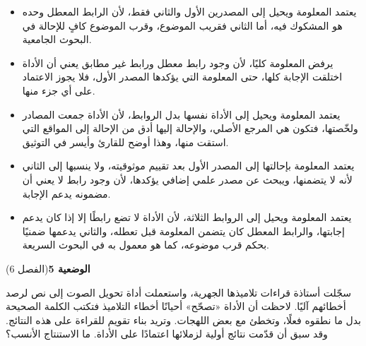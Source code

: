 \documentclass[11pt,a4paper]{article}
\begin{document}
\begin{itemize}[leftmargin=1.0cm, labelsep=6pt, itemsep=3pt, topsep=4pt, parsep=0pt]
  \item[\textbf{أ)}] يعتمد المعلومة ويحيل إلى المصدرين الأول والثاني فقط، لأن الرابط المعطل وحده هو المشكوك فيه، أما الثاني فقريب الموضوع، وقرب الموضوع كافٍ للإحالة في البحوث الجامعية.
  \item[\textbf{ب)}] يرفض المعلومة كليًا، لأن وجود رابط معطل ورابط غير مطابق يعني أن الأداة اختلقت الإجابة كلها، حتى المعلومة التي يؤكدها المصدر الأول، فلا يجوز الاعتماد على أي جزء منها.
  \item[\textbf{ج)}] يعتمد المعلومة ويحيل إلى الأداة نفسها بدل الروابط، لأن الأداة جمعت المصادر ولخّصتها، فتكون هي المرجع الأصلي، والإحالة إليها أدق من الإحالة إلى المواقع التي استقت منها، وهذا أوضح للقارئ وأيسر في التوثيق.
  \item[\textbf{د)}] يعتمد المعلومة بإحالتها إلى المصدر الأول بعد تقييم موثوقيته، ولا ينسبها إلى الثاني لأنه لا يتضمنها، ويبحث عن مصدر علمي إضافي يؤكدها، لأن وجود رابط لا يعني أن مضمونه يدعم الإجابة.
  \item[\textbf{هـ)}] يعتمد المعلومة ويحيل إلى الروابط الثلاثة، لأن الأداة لا تضع رابطًا إلا إذا كان يدعم إجابتها، والرابط المعطل كان يتضمن المعلومة قبل تعطله، والثاني يدعمها ضمنيًا بحكم قرب موضوعه، كما هو معمول به في البحوث السريعة.
\end{itemize}
\par\vspace{6pt}
\noindent
{\large\khatt\textbf{الوضعية 5}}\hfill{\small(الفصل 6)}\par\nopagebreak\vspace{3pt}
\setlength{\fboxsep}{7pt}\colorbox{gray!10}{\parbox{\dimexpr\linewidth-14pt}{سجّلت أستاذة قراءات تلاميذها الجهرية، واستعملت أداة تحويل الصوت إلى نص لرصد أخطائهم آليًا. لاحظت أن الأداة «تصحّح» أحيانًا أخطاء التلاميذ فتكتب الكلمة الصحيحة بدل ما نطقوه فعلًا، وتخطئ مع بعض اللهجات. وتريد بناء تقويم للقراءة على هذه النتائج. وقد سبق أن قدّمت نتائج أولية لزملائها اعتمادًا على الأداة. ما الاستنتاج الأنسب؟}}\par\nopagebreak
\end{document}
